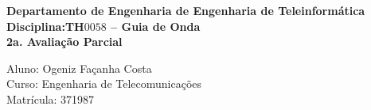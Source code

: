 \documentclass[a4paper,12pt]{article}
\begin{document}
{
%
     {\sf
       \vspace*{4cm}
      \begin{center}
         {\Large {\bfseries Departamento de Engenharia de Engenharia de Teleinformática}}\\
         \vspace*{1.0cm}
         {\Large{\bfseries Disciplina:TH$0058$ -- Guia de Onda}}\\
         \vspace*{1.0cm}
         {\large{\bfseries 2a. Avaliação Parcial}}
     \end{center}
 \vspace*{10.0cm}
    {\Large
        \begin{flushleft}
	       \noindent Aluno: Ogeniz Façanha Costa\\
	       Curso: Engenharia de Telecomunicações\\
	       Matrícula: 371987\\
        \end{flushleft}}
    }
%
\newpage
%

}
%
%
%
%
\end{document}
